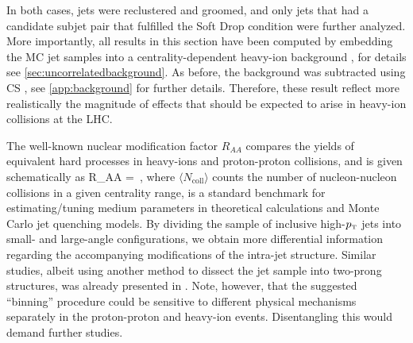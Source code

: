 In both cases, jets were reclustered and groomed, and only jets that had a candidate subjet pair that fulfilled the Soft Drop condition were further analyzed.
More importantly, all results in this section have been computed by embedding the MC jet samples into a centrality-dependent heavy-ion background \cite{deBarros:2012ws}, for details see \autoref{sec:uncorrelatedbackground}. As before, the background was subtracted using CS \cite{Berta:2014eza}, see \autoref{app:background} for further details. Therefore, these result reflect more realistically the magnitude of effects that should be expected to arise in heavy-ion collisions at the LHC.

The well-known nuclear modification factor $R_{AA}$ compares the yields of equivalent hard processes in heavy-ions and proton-proton collisions, and is given schematically as
\beq
\label{eq:RAA}
R_{AA} =  \,,
\eeq
where $\langle N_\text{coll} \rangle$ counts the number of nucleon-nucleon collisions in a given centrality range,
is a standard benchmark for estimating/tuning medium parameters in theoretical calculations and Monte Carlo jet quenching models. By dividing the sample of inclusive high-$p_{\text{\tiny T}}$ jets into small- and large-angle configurations, we obtain more differential information regarding the accompanying modifications of the intra-jet structure. Similar studies, albeit using another method to dissect the jet sample into two-prong structures, was already presented in \cite{Zhang:2015trf,Apolinario:2017qay}.
Note, however, that the suggested ``binning'' procedure could be sensitive to different physical mechanisms separately in the proton-proton and heavy-ion events. Disentangling this would demand further studies.

